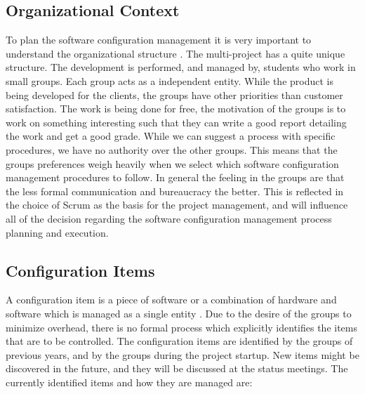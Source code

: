 \subsection{Organizational Context}
To plan the software configuration management it is very important to understand the organizational structure \parencite{swebok}. The multi-project has a quite unique structure. The development is performed, and managed by, students who work in small groups. Each group acts as a independent entity. While the product is being developed for the clients, the groups have other priorities than customer satisfaction. The work is being done for free, the motivation of the groups is to work on something interesting such that they can write a good report detailing the work and get a good grade. While we can suggest a process with specific procedures, we have no authority over the other groups. This means that the groups preferences weigh heavily when we select which software configuration management procedures to follow. In general the feeling in the groups are that the less formal communication and bureaucracy the better. This is reflected in the choice of Scrum as the basis for the project management, and will influence all of the decision regarding the software configuration management process planning and execution.

\subsection{Configuration Items}
A configuration item is a piece of software or a combination of hardware and software which is managed as a single entity \parencite{swebok}. Due to the desire of the groups to minimize overhead, there is no formal process which explicitly identifies the items that are to be controlled. The configuration items are identified by the groups of previous years, and by the groups during the project startup. New items might be discovered in the future, and they will be discussed at the status meetings. The currently identified items and how they are managed are:

